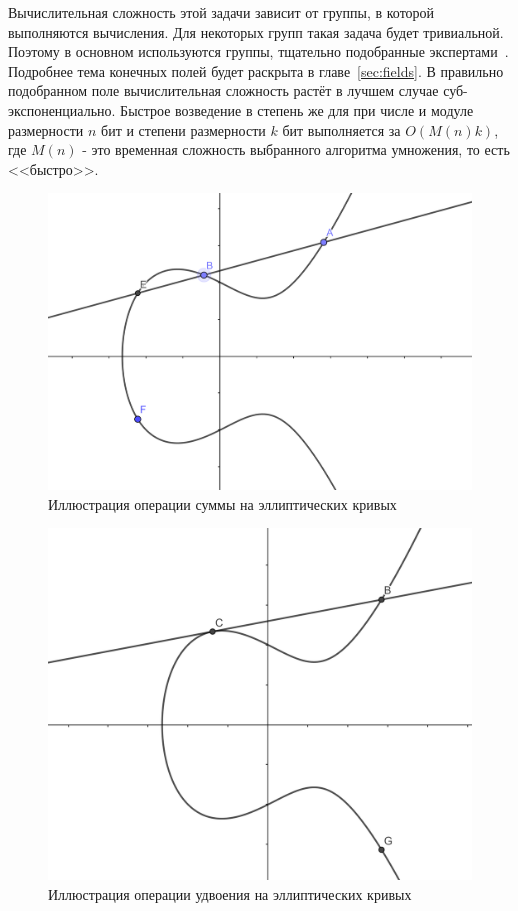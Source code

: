 \documentclass[times,specification,annotation]{itmo-student-thesis}
\begin{document}
Вычислительная сложность этой задачи зависит от группы, в которой выполняются вычисления.
Для некоторых групп такая задача будет тривиальной.
Поэтому в основном используются группы, тщательно подобранные экспертами~\cite{rfc2412}.
Подробнее тема конечных полей будет раскрыта в главе~\ref{sec:fields}.
В правильно подобранном поле вычислительная сложность растёт в лучшем случае суб-экспоненциально.
Быстрое возведение в степень же для при числе и модуле размерности $n$ бит и степени размерности $k$ бит
выполняется за $O(M(n)k)$, где $M(n)$ - это временная сложность выбранного алгоритма умножения, то есть <<быстро>>.

\begin{figure}[!b]
\caption{Иллюстрация операции суммы на эллиптических кривых}\label{fig:ec_sum}
\includegraphics[width=15cm]{graphics/ec_summation.png}
\end{figure}
\begin{figure}[!h]
\caption{Иллюстрация операции удвоения на эллиптических кривых}\label{fig:ec_doub}
\includegraphics[width=15cm]{graphics/ec_doubling.png}
\end{figure}
\end{document}
